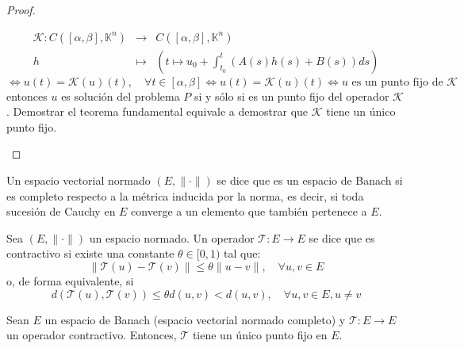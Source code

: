 \begin{proof}
\begin{enumerate}
\[\begin{matrix}
                \mathcal{K} : C([\alpha, \beta], \mathbb{K}^n) & \to & C([\alpha, \beta], \mathbb{K}^n) \\
                h & \mapsto & \left( t \mapsto u_0 + \int_{t_0}^{t} (A(s) h(s) + B(s)) ds \right)
            \end{matrix}
        \]
        \[
            \iff u(t) = \mathcal{K}(u)(t), \quad \forall t \in [\alpha, \beta] \iff u(t) = \mathcal{K}(u)(t) \iff u \text{ es un punto fijo de } \mathcal{K}
        \]
        entonces $u$ es solución del problema $P$ si y sólo si es un punto fijo del operador $\mathcal{K}$.
        Demostrar el teorema fundamental equivale a demostrar que $\mathcal{K}$ tiene un único punto fijo.
    \end{enumerate}
\end{proof}

\begin{definición} 
    Un espacio vectorial normado $(E, \| \cdot \|)$ se dice que es un espacio de Banach si es completo respecto a la métrica inducida por la norma, es decir, si toda sucesión de Cauchy en $E$ converge a un elemento que también pertenece a $E$.    
\end{definición}

\begin{definición} 
    Sea $(E, \| \cdot \|)$ un espacio normado. Un operador $\mathcal{T} : E \to E$ se dice que es contractivo si existe una constante $\theta \in [0,1)$ tal que:
    \[
        \| \mathcal{T}(u) - \mathcal{T}(v) \| \leq \theta \| u - v \|, \quad \forall u,v \in E
    \]
    o, de forma equivalente, si
    \[
        d(\mathcal{T}(u), \mathcal{T}(v)) \leq \theta d(u,v) < d(u,v), \quad \forall u,v \in E, u \neq v
    \]
\end{definición}

\begin{teorema} 
    Sean $E$ un espacio de Banach (espacio vectorial normado completo) y $\mathcal{T} : E \to E$ un operador contractivo. Entonces, $\mathcal{T}$ tiene un único punto fijo en $E$.
\end{teorema}


